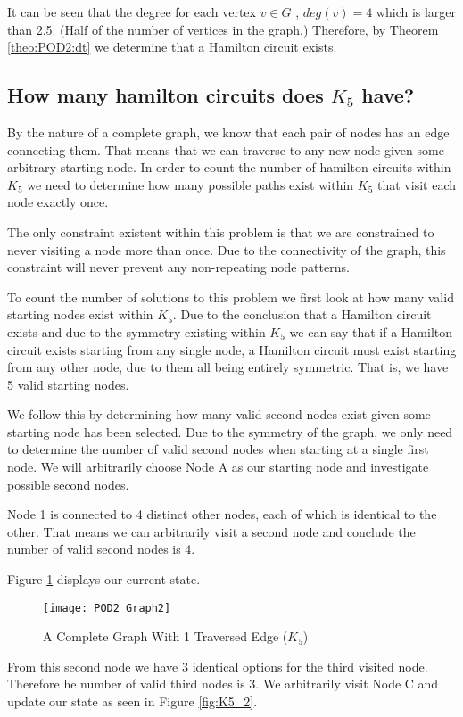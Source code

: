 \documentclass{article}
\begin{document}
It can be seen that the degree for each vertex $v \in G$ , $deg(v)=4$ which is larger than 2.5. (Half of the number of vertices in the graph.) Therefore, by Theorem \ref{theo:POD2:dt} we determine that a Hamilton circuit exists.

\subsection{How many hamilton circuits does $K_5$ have?}
By the nature of a complete graph, we know that each pair of nodes has an edge connecting them. That means that we can traverse to any new node given some arbitrary starting node. In order to count the number of hamilton circuits within $K_5$ we need to determine how many possible paths exist within $K_5$ that visit each node exactly once.

The only constraint existent within this problem is that we are constrained to never visiting a node more than once. Due to the connectivity of the graph, this constraint will never prevent any non-repeating node patterns.

To count the number of solutions to this problem we first look at how many valid starting nodes exist within $K_5$. Due to the conclusion that a Hamilton circuit exists and due to the symmetry existing within $K_5$ we can say that if a Hamilton circuit exists starting from any single node, a Hamilton circuit must exist starting from any other node, due to them all being entirely symmetric. That is, we have 5 valid starting nodes.

We follow this by determining how many valid second nodes exist given some starting node has been selected. Due to the symmetry of the graph, we only need to determine the number of valid second nodes when starting at a single first node. We will arbitrarily choose Node A as our starting node and investigate possible second nodes.

Node 1 is connected to 4 distinct other nodes, each of which is identical to the other. That means we can arbitrarily visit a second node and conclude the number of valid second nodes is 4.

Figure \ref{fig:K5_1} displays our current state.

\begin{figure}[ht]
\centering
\texttt{[image: POD2\_Graph2]}
\caption{A Complete Graph With 1 Traversed Edge ($K_5$)}
\label{fig:K5_1}
\end{figure}

\newpage
From this second node we have 3 identical options for the third visited node. Therefore he number of valid third nodes is 3. We arbitrarily visit Node C and update our state as seen in Figure \ref{fig:K5_2}.
\end{document}
